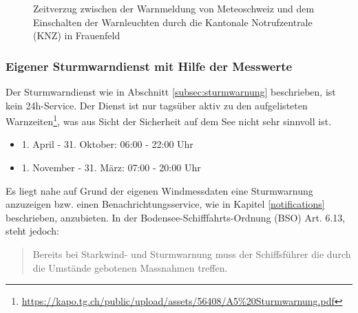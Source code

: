 \begin{figure}[h!]
	\centering
	\caption[Zeitverzug zwischen Sturmwarnmeldung und Anzeige]{Zeitverzug zwischen der Warnmeldung von Meteoschweiz und dem Einschalten der Warnleuchten durch die Kantonale Notrufzentrale (KNZ) in Frauenfeld}
	\label{img:sturmZeit}
\end{figure}


\subsubsection{Eigener Sturmwarndienst mit Hilfe der Messwerte}
Der Sturmwarndienst wie in Abschnitt \ref{subsec:sturmwarnung} beschrieben, ist kein 24h-Service. Der Dienst ist nur tagsüber aktiv zu den aufgelisteten Warnzeiten\footnote{ \url{https://kapo.tg.ch/public/upload/assets/56408/A5\%20Sturmwarnung.pdf}}, was aus Sicht der Sicherheit auf dem See nicht sehr sinnvoll ist.

\begin{itemize}
\item 1. April - 31. Oktober: 06:00 - 22:00 Uhr
\item 1. November - 31. März: 07:00 - 20:00 Uhr
\end{itemize}

\noindent
Es liegt nahe auf Grund der eigenen Windmessdaten eine Sturmwarnung anzuzeigen bzw. einen Benachrichtungsservice, wie in Kapitel \ref{notifications} beschrieben, anzubieten. In der Bodensee-Schifffahrts-Ordnung (BSO) Art. 6.13, steht jedoch:

\begin{quote}
\flqq Bereits bei Starkwind- und Sturmwarnung muss der Schiffsführer die durch die Umstände gebotenen Massnahmen treffen.\frqq
\end{quote}

